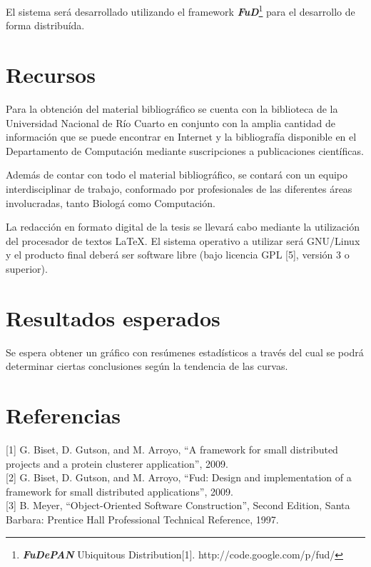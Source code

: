 \documentclass[12pt,a4paper]{article}
\begin{document}
\par El sistema será desarrollado utilizando el framework \textbf{\textit{FuD}}\footnote{\textbf{\textit{FuDePAN}} Ubiquitous Distribution[1]. http://code.google.com/p/fud/} para el desarrollo de forma distribuída.

\section{Recursos}

\par Para la obtención del material bibliográfico se cuenta con la biblioteca de la Universidad Nacional de Río Cuarto en conjunto con la amplia cantidad de información que se puede encontrar en Internet y la bibliografía disponible en el Departamento de Computación mediante suscripciones a publicaciones científicas.

\par Además de contar con todo el material bibliográfico, se contará con un equipo interdisciplinar de trabajo, conformado por profesionales de las diferentes áreas involucradas, tanto Biolog\'a como Computaci\'on. 

\par La redacción en formato digital de la tesis se llevará cabo mediante la utilización del procesador de textos \LaTeX. El sistema operativo a utilizar será GNU/Linux y el producto final deberá ser software libre (bajo licencia GPL [5], versión 3 o superior).

\section{Resultados esperados}
Se espera obtener un gráfico con resúmenes estadísticos a través del cual se podrá determinar ciertas conclusiones según la tendencia de las curvas. 

\section*{Referencias}
[1] G. Biset, D. Gutson, and M. Arroyo, “A framework for small distributed projects and a protein clusterer application”, 2009. \\

[2] G. Biset, D. Gutson, and M. Arroyo, “Fud: Design and implementation of a framework for small distributed applications”, 2009. \\

[3] B. Meyer, “Object-Oriented Software Construction”, Second Edition, Santa Barbara: Prentice Hall Professional Technical Reference, 1997. \\
\end{document}
